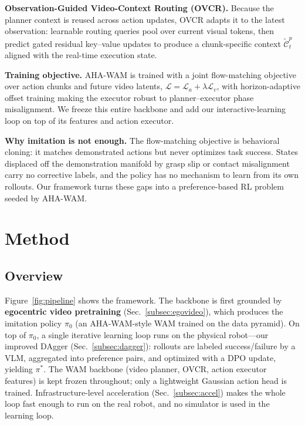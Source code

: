 \documentclass[letterpaper, 10pt, conference]{ieeeconf}
\begin{document}
\textbf{Observation-Guided Video-Context Routing (OVCR).} Because the planner context is reused across action updates, OVCR adapts it to the latest observation: learnable routing queries pool over current visual tokens, then predict gated residual key--value updates to produce a chunk-specific context $\tilde{\mathcal{C}}^{p}_{t}$ aligned with the real-time execution state.

\textbf{Training objective.} AHA-WAM is trained with a joint flow-matching objective over action chunks and future video latents, $\mathcal{L}=\mathcal{L}_a+\lambda\mathcal{L}_v$, with horizon-adaptive offset training making the executor robust to planner--executor phase misalignment. We freeze this entire backbone and add our interactive-learning loop on top of its features and action executor.

\textbf{Why imitation is not enough.} The flow-matching objective is behavioral cloning: it matches demonstrated actions but never optimizes task success. States displaced off the demonstration manifold by grasp slip or contact misalignment carry no corrective labels, and the policy has no mechanism to learn from its own rollouts. Our framework turns these gaps into a preference-based RL problem seeded by AHA-WAM.

\section{Method}
\label{sec:methodology}

\subsection{Overview}
\label{subsec:overview}

Figure~\ref{fig:pipeline} shows the framework. The backbone is first grounded by \textbf{egocentric video pretraining} (Sec.~\ref{subsec:egovideo}), which produces the imitation policy $\pi_0$ (an AHA-WAM-style WAM trained on the data pyramid). On top of $\pi_0$, a single iterative learning loop runs on the physical robot---our improved DAgger (Sec.~\ref{subsec:dagger}): rollouts are labeled success/failure by a VLM, aggregated into preference pairs, and optimized with a DPO update, yielding $\pi^{*}$. The WAM backbone (video planner, OVCR, action executor features) is kept frozen throughout; only a lightweight Gaussian action head is trained. Infrastructure-level acceleration (Sec.~\ref{subsec:accel}) makes the whole loop fast enough to run on the real robot, and no simulator is used in the learning loop.
\end{document}
